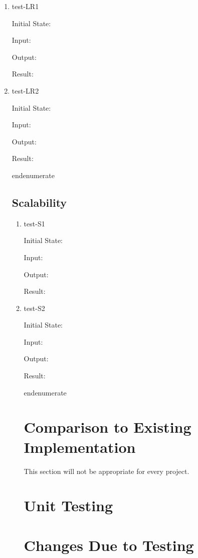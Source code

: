 \documentclass[12pt, titlepage]{article}
\begin{document}
\begin{enumerate}
\begin{enumerate}
\begin{enumerate}
\begin{enumerate}
\begin{enumerate}
\begin{enumerate}
\begin{enumerate}
\begin{enumerate}

  \item{test-LR1} \label{test-LR1}

  Initial State:

  Input:

  Output:

  Result:

  \item{test-LR2} \label{test-LR2}

  Initial State:

  Input:

  Output:

  Result:

end{enumerate}

\subsection{Scalability} \label{section:4.9}

\begin{enumerate}

  \item{test-S1} \label{test-S1}

  Initial State:

  Input:

  Output:

  Result:

  \item{test-S2} \label{test-S2}

  Initial State:

  Input:

  Output:

  Result:

end{enumerate}


\section{Comparison to Existing Implementation}	

This section will not be appropriate for every project.

\section{Unit Testing}

\section{Changes Due to Testing}


\end{enumerate}
\end{enumerate}
\end{enumerate}
\end{enumerate}
\end{enumerate}
\end{enumerate}
\end{enumerate}
\end{enumerate}
\end{enumerate}
\end{document}
